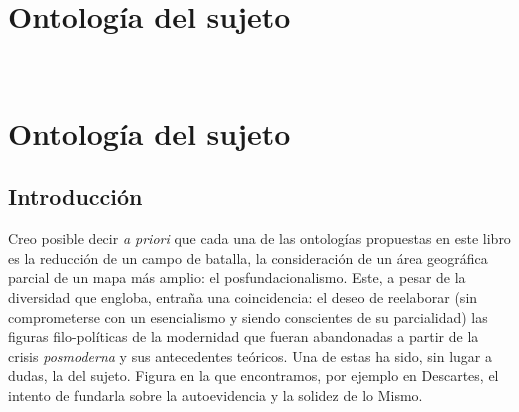 \ifPDF
\chapter[\hspace{1.5pc}Ontología del sujeto]{Ontología del sujeto}
\setcounter{PrimPag}{\theCurrentPage}

\begin{center}
	\\
	\vspace{20mm}
\end{center}
\else
\ifHTMLEPUB
\chapter{Ontología del sujeto}
\fi
\fi

\section{Introducción}

Creo posible decir \emph{a priori} que cada una de las ontologías propuestas en este libro es la reducción de un campo de batalla, la consideración de un área geográfica parcial de un mapa más amplio: el posfundacionalismo. Este, a pesar de la diversidad que engloba, entraña una coincidencia: el deseo de reelaborar (sin comprometerse con un esencialismo y siendo conscientes de su parcialidad) las figuras filo-políticas de la modernidad que fueran abandonadas a partir de la crisis \emph{posmoderna} y sus antecedentes teóricos. Una de estas ha sido, sin lugar a dudas, la del sujeto. Figura en la que encontramos, por ejemplo en Descartes, el intento de fundarla sobre la autoevidencia y la solidez de lo Mismo.

